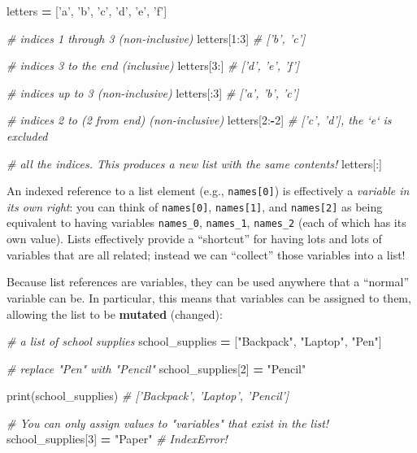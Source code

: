 \documentclass[]{book}
\newenvironment{Shaded}{\begin{snugshade}}{\end{snugshade}}
\newcommand{\DecValTok}[1]{\textcolor[rgb]{0.00,0.00,0.81}{#1}}
\newcommand{\StringTok}[1]{\textcolor[rgb]{0.31,0.60,0.02}{#1}}
\newcommand{\CommentTok}[1]{\textcolor[rgb]{0.56,0.35,0.01}{\textit{#1}}}
\newcommand{\OperatorTok}[1]{\textcolor[rgb]{0.81,0.36,0.00}{\textbf{#1}}}
\newcommand{\BuiltInTok}[1]{#1}
\newcommand{\NormalTok}[1]{#1}
\begin{document}
\begin{Shaded}
\begin{Highlighting}[]
\NormalTok{letters }\OperatorTok{=}\NormalTok{ [}\StringTok{'a'}\NormalTok{, }\StringTok{'b'}\NormalTok{, }\StringTok{'c'}\NormalTok{, }\StringTok{'d'}\NormalTok{, }\StringTok{'e'}\NormalTok{, }\StringTok{'f'}\NormalTok{]}

\CommentTok{# indices 1 through 3 (non-inclusive)}
\NormalTok{letters[}\DecValTok{1}\NormalTok{:}\DecValTok{3}\NormalTok{]  }\CommentTok{# ['b', 'c']}

\CommentTok{# indices 3 to the end (inclusive)}
\NormalTok{letters[}\DecValTok{3}\NormalTok{:]  }\CommentTok{# ['d', 'e', 'f']}

\CommentTok{# indices up to 3 (non-inclusive)}
\NormalTok{letters[:}\DecValTok{3}\NormalTok{]  }\CommentTok{# ['a', 'b', 'c']}

\CommentTok{# indices 2 to (2 from end) (non-inclusive)}
\NormalTok{letters[}\DecValTok{2}\NormalTok{:}\OperatorTok{-}\DecValTok{2}\NormalTok{]  }\CommentTok{# ['c', 'd'], the `e` is excluded}

\CommentTok{# all the indices. This produces a new list with the same contents!}
\NormalTok{letters[:]}
\end{Highlighting}
\end{Shaded}

An indexed reference to a list element (e.g., \texttt{names{[}0{]}}) is
effectively a \emph{variable in its own right}: you can think of
\texttt{names{[}0{]}}, \texttt{names{[}1{]}}, and \texttt{names{[}2{]}}
as being equivalent to having variables \texttt{names\_0},
\texttt{names\_1}, \texttt{names\_2} (each of which has its own value).
Lists effectively provide a ``shortcut'' for having lots and lots of
variables that are all related; instead we can ``collect'' those
variables into a list!

Because list references are variables, they can be used anywhere that a
``normal'' variable can be. In particular, this means that variables can
be assigned to them, allowing the list to be \textbf{mutated} (changed):

\begin{Shaded}
\begin{Highlighting}[]
\CommentTok{# a list of school supplies}
\NormalTok{school_supplies }\OperatorTok{=}\NormalTok{ [}\StringTok{"Backpack"}\NormalTok{, }\StringTok{"Laptop"}\NormalTok{, }\StringTok{"Pen"}\NormalTok{]}

\CommentTok{# replace "Pen" with "Pencil"}
\NormalTok{school_supplies[}\DecValTok{2}\NormalTok{] }\OperatorTok{=} \StringTok{"Pencil"}

\BuiltInTok{print}\NormalTok{(school_supplies)  }\CommentTok{# ['Backpack', 'Laptop', 'Pencil']}

\CommentTok{# You can only assign values to "variables" that exist in the list!}
\NormalTok{school_supplies[}\DecValTok{3}\NormalTok{] }\OperatorTok{=} \StringTok{"Paper"}  \CommentTok{# IndexError!}
\end{Highlighting}
\end{Shaded}
\end{document}
